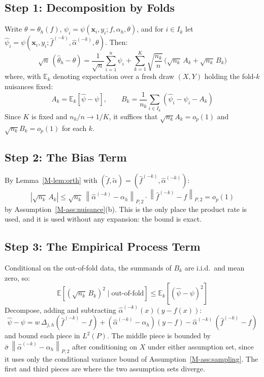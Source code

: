 \documentclass[12pt,a4paper]{article}
\numberwithin{equation}{section}
\theoremstyle{plain}
\theoremstyle{definition}
\newcommand{\norm}[1]{\left\| #1 \right\|}
\newcommand{\E}{\mathbb{E}}
\newcommand{\abs}[1]{\left| #1 \right|}
\newcommand{\Dh}{\Delta_{j,h}}
\newcommand{\Ptwo}[1]{\norm{#1}_{P,2}}
\begin{document}
	\subsection{Step 1: Decomposition by Folds}
	
	Write $\theta = \theta_h(f)$,
	$\psi_i = \psi(\mathbf{x}_i, y_i; f, \alpha_h, \theta)$, and for
	$i \in I_k$ let
	$\hat{\psi}_i = \psi(\mathbf{x}_i, y_i; \hat{f}^{(-k)},
	\hat{\alpha}^{(-k)}, \theta)$. Then:
	\begin{equation}
		\sqrt{n}\,(\hat{\theta}_h - \theta)
		= \frac{1}{\sqrt{n}} \sum_{i=1}^{n} \psi_i
		+ \sum_{k=1}^{K} \sqrt{\frac{n_k}{n}}\,\bigl(\sqrt{n_k}\, A_k
		+ \sqrt{n_k}\, B_k\bigr)
	\end{equation}
	where, with $\E_k$ denoting expectation over a fresh draw $(X, Y)$ holding the
	fold-$k$ nuisances fixed:
	\begin{equation}
		A_k = \E_k\left[\hat{\psi} - \psi\right],
		\qquad
		B_k = \frac{1}{n_k} \sum_{i \in I_k}
		\left(\hat{\psi}_i - \psi_i - A_k\right)
	\end{equation}
	Since $K$ is fixed and $n_k / n \to 1/K$, it suffices that
	$\sqrt{n_k} A_k = o_p(1)$ and $\sqrt{n_k} B_k = o_p(1)$ for each $k$.
	
	\subsection{Step 2: The Bias Term}
	
	By Lemma~\ref{M-lem:orth} with
	$(\tilde{f}, \tilde{\alpha}) = (\hat{f}^{(-k)}, \hat{\alpha}^{(-k)})$:
	\begin{equation}
		\abs{\sqrt{n_k}\, A_k}
		\leq \sqrt{n_k}\, \Ptwo{\hat{\alpha}^{(-k)} - \alpha_h}
		\cdot \Ptwo{\hat{f}^{(-k)} - f} = o_p(1)
	\end{equation}
	by Assumption~\ref{M-ass:nuisance}(b). This is the only place the product rate is
	used, and it is used without any expansion: the bound is exact.
	
	\subsection{Step 3: The Empirical Process Term}
	
	Conditional on the out-of-fold data, the summands of $B_k$ are i.i.d.\ and
	mean zero, so:
	\begin{equation}
		\E\left[(\sqrt{n_k}\, B_k)^2 \mid \text{out-of-fold}\right]
		\leq \E_k\left[(\hat{\psi} - \psi)^2\right]
	\end{equation}
	Decompose, adding and subtracting $\hat{\alpha}^{(-k)}(x)(y - f(x))$:
	\begin{equation}
		\hat{\psi} - \psi
		= w\, \Dh(\hat{f}^{(-k)} - f)
		+ (\hat{\alpha}^{(-k)} - \alpha_h)(y - f)
		- \hat{\alpha}^{(-k)}\,(\hat{f}^{(-k)} - f)
	\end{equation}
	and bound each piece in $L^2(P)$. The middle piece is bounded by
	$\bar{\sigma}\, \Ptwo{\hat{\alpha}^{(-k)} - \alpha_h}$ after conditioning on $X$
	under either assumption set, since it uses only the conditional variance bound of
	Assumption~\ref{M-ass:sampling}. The first and third pieces are where the two
	assumption sets diverge.
\end{document}
